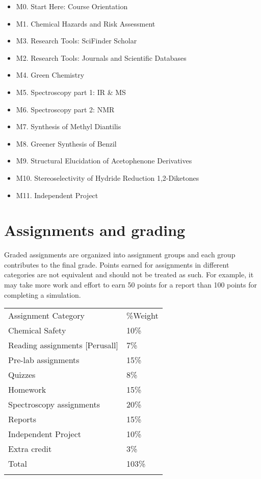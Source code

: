 \begin{itemize}
\tightlist
\item
  M0. Start Here: Course Orientation
\item
  M1. Chemical Hazards and Risk Assessment
\item
  M3. Research Tools: SciFinder Scholar
\item
  M2. Research Tools: Journals and Scientific Databases
\item
  M4. Green Chemistry
\item
  M5. Spectroscopy part 1: IR \& MS
\item
  M6. Spectroscopy part 2: NMR
\item
  M7. Synthesis of Methyl Diantilis
\item
  M8. Greener Synthesis of Benzil
\item
  M9. Structural Elucidation of Acetophenone Derivatives
\item
  M10. Stereoselectivity of Hydride Reduction 1,2-Diketones
\item
  M11. Independent Project
\end{itemize}

\hypertarget{assignments-and-grading}{%
\section{Assignments and grading}\label{assignments-and-grading}}

Graded assignments are organized into assignment groups and each group
contributes to the final grade. Points earned for assignments in
different categories are not equivalent and should not be treated as
such. For example, it may take more work and effort to earn 50 points
for a report than 100 points for completing a simulation.

\begin{longtable}[]{@{}ll@{}}
\toprule
Assignment Category & \%Weight \\ \addlinespace
\midrule
\endhead
Chemical Safety & 10\% \\ \addlinespace
Reading assignments {[}Perusall{]} & 7\% \\ \addlinespace
Pre-lab assignments & 15\% \\ \addlinespace
Quizzes & 8\% \\ \addlinespace
Homework & 15\% \\ \addlinespace
Spectroscopy assignments & 20\% \\ \addlinespace
Reports & 15\% \\ \addlinespace
Independent Project & 10\% \\ \addlinespace
Extra credit & 3\% \\ \addlinespace
Total & 103\% \\ \addlinespace
\bottomrule
\end{longtable}

